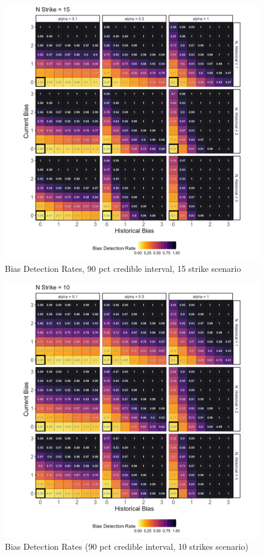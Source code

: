 \documentclass[12pt]{article}
\begin{document}
\begin{figure}

{\centering \includegraphics[width=0.95\linewidth]{../figures/pp15_90CI} 

}

\caption{Bias Detection Rates, 90 pct credible interval, 15 strike scenario}\label{fig:figbd9015}
\end{figure}

\begin{figure}

{\centering \includegraphics[width=0.95\linewidth]{../figures/pp10_90CI} 

}

\caption{Bias Detection Rates (90 pct credible interval, 10 strikes scenario)}\label{fig:figbd9010}
\end{figure}
\end{document}
